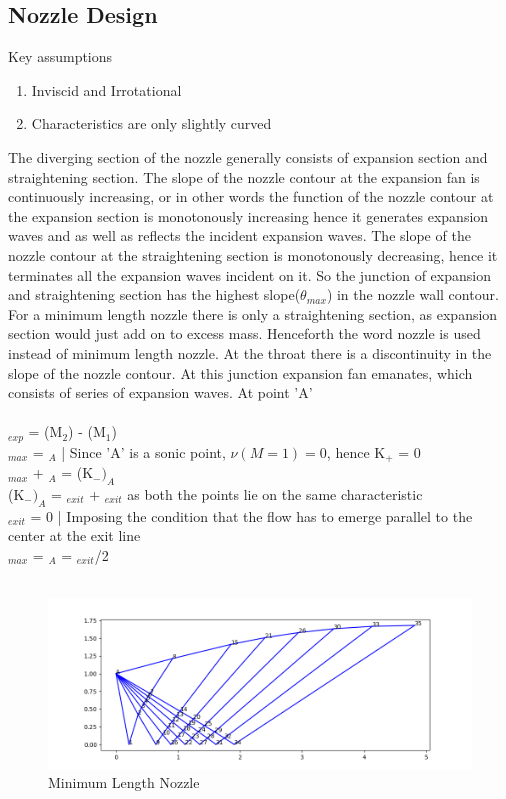 \subsection{Nozzle Design}
Key assumptions
\begin{enumerate}
\setlength\itemsep{0.01em}
    \vspace{-2mm}
    \item Inviscid and Irrotational
    \vspace{-2mm}
    \item Characteristics are only slightly curved
\end{enumerate}
The diverging section of the nozzle generally consists of expansion section and straightening section. The slope of the nozzle contour at the expansion fan is continuously increasing, or in other words the function of the nozzle contour at the expansion section is monotonously increasing hence it generates expansion waves and as well as reflects the incident expansion waves. The slope of the nozzle contour at the straightening section is monotonously decreasing, hence it terminates all the expansion waves incident on it. So the junction of expansion and straightening section has the highest slope($\theta_{max}$) in the nozzle wall contour. For a minimum length nozzle there is only a straightening section, as expansion section would just add on to excess mass. Henceforth the word nozzle is used instead of minimum length nozzle. At the throat there is a discontinuity in the slope of the nozzle contour. At this junction expansion fan emanates, which consists of series of expansion waves. At point 'A'\\
\\
   \theta$_{exp}$ = \nu(M$_2$) - \nu(M$_1$)\\
    \theta$_{max}$ = \nu$_A$ | Since 'A' is a sonic point, $\nu(M = 1) = 0$, hence K$_+$ = 0\\
    \theta$_{max}$ + \nu$_A$ = (K$_-)_A$\\ 
    (K$_-)_A$ = \theta$_{exit}$ + \nu$_{exit}$ as both the points lie on the same characteristic\\
    \theta$_{exit}$ = 0 | Imposing the condition that the flow has to emerge parallel to the center at the exit
    line\\
    \theta$_{max}$ = \nu$_A$ = \nu$_{exit}$/2\\
\\
\begin{figure}[H]
    \centering
    \includegraphics[width=1\textwidth]{text/MoC_Mine_Blue.png}
    \caption{Minimum Length Nozzle}
    \label{fig:Minimum Length Nozzle}
\end{figure}
